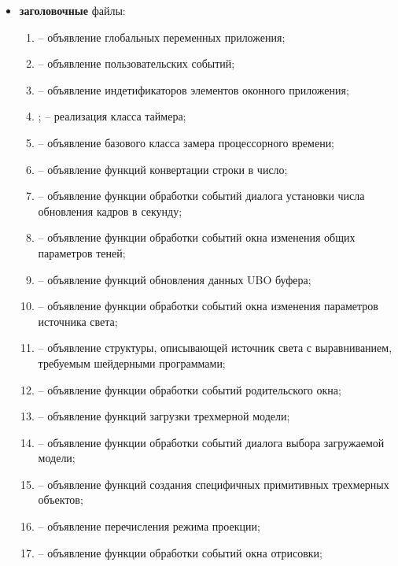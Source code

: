 \begin{itemize}[label=---]
    \item \textbf{заголовочные} файлы:
    \begin{enumerate}[label=\arabic*), labelsep=0.5em]
        \item {} -- объявление глобальных переменных приложения;
        \item {} -- объявление пользовательских событий;
        \item {} -- объявление индетификаторов элементов оконного приложения;
        \item {}; -- реализация класса таймера;
        \item {} -- объявление базового класса замера процессорного времени;
        \item {} -- объявление функций конвертации строки в число;
        \item {} -- объявление функции обработки событий диалога установки числа обновления кадров в секунду;
        \item {} -- объявление функции обработки событий окна изменения общих параметров теней;
        \item {} -- объявление функций обновления данных UBO буфера;
        \item {} -- объявление функции обработки событий окна изменения параметров источника света;
        \item {} -- объявление структуры, описывающей источник света с выравниванием, требуемым шейдерными программами;
        \item {} -- объявление функции обработки событий родительского окна;
        \item {} -- объявление функций загрузки трехмерной модели;
        \item {} -- объявление функции обработки событий диалога выбора загружаемой модели;
        \item {} -- объявление функций создания специфичных примитивных трехмерных объектов;
        \item {} -- объявление перечисления режима проекции;
        \item {} -- объявление функции обработки событий окна отрисовки;

\end{enumerate}
\end{itemize}
